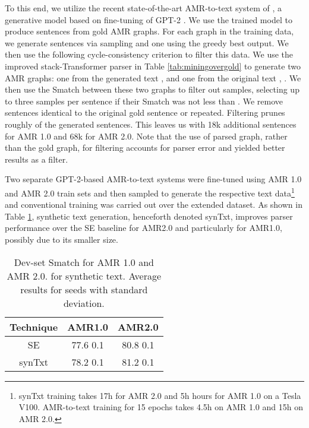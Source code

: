 \documentclass[11pt,a4paper]{article}
\begin{document}
To this end, we utilize the recent state-of-the-art AMR-to-text system of , a generative model based on fine-tuning of GPT-2 \cite{radford2019language}. We use the trained model  to produce sentences from gold AMR graphs. For each graph  in the training data, we generate  sentences via sampling  and one using the greedy best output. We then use the following cycle-consistency criterion to filter this data. We use the improved stack-Transformer parser in Table \ref{tab:miningovergold} to generate two AMR graphs: one from the generated text ,  and one from the original text , . We then use the Smatch between these two graphs to filter out samples, selecting up to three samples per sentence if their Smatch was not less than . We remove sentences identical to the original gold sentence or repeated. Filtering prunes roughly  of the generated sentences. This leaves us with 18k additional sentences for AMR 1.0 and 68k for AMR 2.0. Note that the use of parsed graph, rather than the gold graph, for filtering accounts for parser error and yielded better results as a filter.

Two separate GPT-2-based AMR-to-text systems were fine-tuned using AMR 1.0 and AMR 2.0 train sets and then sampled to generate the respective text data\footnote{synTxt training takes 17h for AMR 2.0 and 5h hours for AMR 1.0 on a Tesla V100. AMR-to-text training for 15 epochs takes 4.5h on AMR 1.0 and 15h on AMR 2.0.} and conventional training was carried out over the extended dataset. As shown in Table \ref{tab:syntext}, synthetic text generation, henceforth denoted synTxt, improves parser performance over the \cite{anon2020a}SE baseline for AMR2.0 and particularly for AMR1.0, possibly due to its smaller size.  

\begin{table}[h]
    \centering
    \fontsize{10pt}{12pt}\selectfont
    \setlength{\tabcolsep}{2.0pt}
    \begin{tabular}{c | c | c }
        Technique&{AMR1.0}&{AMR2.0}\\
        \hline
        \cite{anon2020a}SE & 77.6 \footnotesize{0.1} &  80.8 \footnotesize{0.1}\\
        \hline
        synTxt     & 78.2 \footnotesize{0.1} & 81.2 \footnotesize{0.1}\\
        \hline
    \end{tabular}
    \caption{Dev-set Smatch for AMR 1.0 and AMR 2.0. for synthetic text. Average results for  seeds with standard deviation.}
    \label{tab:syntext}
\end{table}
 
\end{document}
